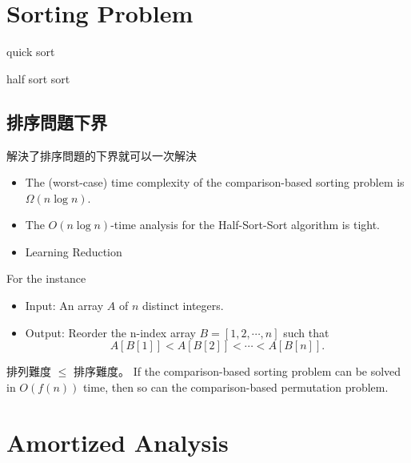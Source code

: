 
\section{Sorting Problem}

\begin{note}
quick sort
\end{note}

\begin{note}
half sort sort
\end{note}

\subsection{排序問題下界}
解決了排序問題的下界就可以一次解決
\begin{itemize}
    \item The (worst-case) time complexity of the comparison-based sorting problem is $\Omega(n\log n)$.
    \item The $O(n \log n)$-time analysis for the Half-Sort-Sort algorithm is tight.
    \item Learning {Reduction}
\end{itemize}

\begin{definition}
    For the instance
    \begin{itemize}
        \item Input: An array $A$ of $n$ distinct integers.
        \item Output: Reorder the n-index array $B = [1, 2, \cdots, n]$ such that \[
        A[B[1]] < A[B[2]] < \cdots < A[B[n]].
        \]
    \end{itemize}
\end{definition}
\vspace{1em}

排列難度 $\leq$ 排序難度。
If the comparison-based sorting problem can be solved in $O(f(n))$ time, then so can the comparison-based permutation problem.

\section{Amortized Analysis}